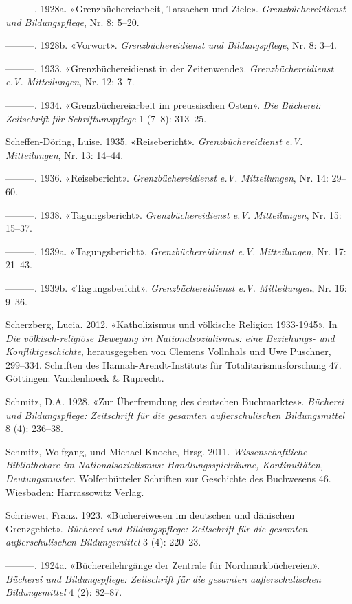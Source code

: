\documentclass[a4paper,
fontsize=11pt,
oneside,
numbers=noperiodatend,
parskip=half-,
bibliography=totoc,
final
]{scrartcl}
\begin{document}
---------. 1928a. «Grenzbüchereiarbeit, Tatsachen und Ziele».
\emph{Grenzbüchereidienst und Bildungspflege}, Nr. 8: 5--20.

---------. 1928b. «Vorwort». \emph{Grenzbüchereidienst und
Bildungspflege}, Nr. 8: 3--4.

---------. 1933. «Grenzbüchereidienst in der Zeitenwende».
\emph{Grenzbüchereidienst e.V. Mitteilungen}, Nr. 12: 3--7.

---------. 1934. «Grenzbüchereiarbeit im preussischen Osten». \emph{Die
Bücherei: Zeitschrift für Schriftumspflege} 1 (7--8): 313--25.

Scheffen-Döring, Luise. 1935. «Reisebericht». \emph{Grenzbüchereidienst
e.V. Mitteilungen}, Nr. 13: 14--44.

---------. 1936. «Reisebericht». \emph{Grenzbüchereidienst e.V.
Mitteilungen}, Nr. 14: 29--60.

---------. 1938. «Tagungsbericht». \emph{Grenzbüchereidienst e.V.
Mitteilungen}, Nr. 15: 15--37.

---------. 1939a. «Tagungsbericht». \emph{Grenzbüchereidienst e.V.
Mitteilungen}, Nr. 17: 21--43.

---------. 1939b. «Tagungsbericht». \emph{Grenzbüchereidienst e.V.
Mitteilungen}, Nr. 16: 9--36.

Scherzberg, Lucia. 2012. «Katholizismus und völkische Religion
1933-1945». In \emph{Die völkisch-reli\-giöse Bewegung im
Nationalsozialismus: eine Beziehungs- und Konfliktgeschichte},
herausgegeben von Clemens Vollnhals und Uwe Puschner, 299--334.
Schriften des Hannah-Arendt-Instituts für Totalitarismusforschung 47.
Göttingen: Vandenhoeck \& Ruprecht.

Schmitz, D.A. 1928. «Zur Überfremdung des deutschen Buchmarktes».
\emph{Bücherei und Bildungspflege: Zeitschrift für die gesamten
außerschulischen Bildungsmittel} 8 (4): 236--38.

Schmitz, Wolfgang, und Michael Knoche, Hrsg. 2011.
\emph{Wissenschaftliche Bibliothekare im Nationalsozialismus:
Handlungsspielräume, Kontinuitäten, Deutungsmuster}. Wolfenbütteler
Schriften zur Geschichte des Buchwesens 46. Wiesbaden: Harrassowitz
Verlag.

Schriewer, Franz. 1923. «Büchereiwesen im deutschen und dänischen
Grenzgebiet». \emph{Bücherei und Bildungspflege: Zeitschrift für die
gesamten außerschulischen Bildungsmittel} 3 (4): 220--23.

---------. 1924a. «Büchereilehrgänge der Zentrale für
Nordmarkbüchereien». \emph{Bücherei und Bildungspflege: Zeitschrift für
die gesamten außerschulischen Bildungsmittel} 4 (2): 82--87.
\end{document}
